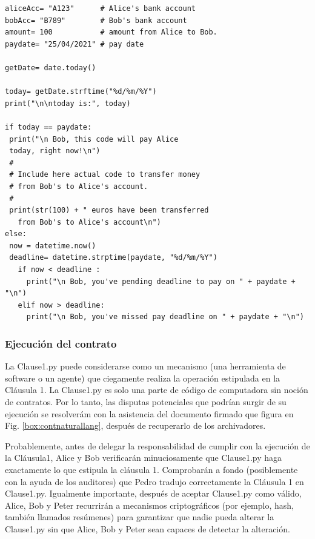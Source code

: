 \documentclass[12pt]{report} %
\begin{document}
\begin{enumerate}
\begin{lstlisting}
aliceAcc= "A123"      # Alice's bank account
bobAcc= "B789"        # Bob's bank account
amount= 100           # amount from Alice to Bob.
paydate= "25/04/2021" # pay date
  
getDate= date.today()
  
today= getDate.strftime("%d/%m/%Y")
print("\n\ntoday is:", today)
  
if today == paydate:
 print("\n Bob, this code will pay Alice 
 today, right now!\n")
 #
 # Include here actual code to transfer money 
 # from Bob's to Alice's account.
 #
 print(str(100) + " euros have been transferred 
   from Bob's to Alice's account\n")
else:
 now = datetime.now()
 deadline= datetime.strptime(paydate, "%d/%m/%Y")
   if now < deadline :
     print("\n Bob, you've pending deadline to pay on " + paydate + "\n")
   elif now > deadline:
     print("\n Bob, you've missed pay deadline on " + paydate + "\n")
\end{lstlisting}




   
\end{enumerate}



\subsubsection{Ejecución del contrato}

La Clause1.py puede considerarse como un mecanismo (una herramienta de software o un agente) que ciegamente realiza la operación estipulada en la Cláusula 1. La Clause1.py es solo una parte de código de computadora sin noción de contratos. Por lo tanto, las disputas potenciales que podrían surgir de su ejecución se resolverám con la asistencia del documento firmado que figura en Fig. \ref{box:contnaturallang}, después de recuperarlo de los archivadores.

Probablemente, antes de delegar la responsabilidad de cumplir con la ejecución de la Cláusula1, Alice y Bob verificarán minuciosamente que Clause1.py haga exactamente lo que estipula la cláusula 1. Comprobarán a fondo (posiblemente con la ayuda de los auditores) que Pedro tradujo correctamente la Cláusula 1 en Clause1.py. Igualmente importante, después de aceptar Clause1.py como válido, Alice, Bob y Peter recurrirán a mecanismos criptográficos (por ejemplo, hash, también llamados resúmenes) para garantizar que nadie pueda alterar la Clause1.py sin que Alice, Bob y Peter sean capaces de detectar la alteración.
\end{document}
